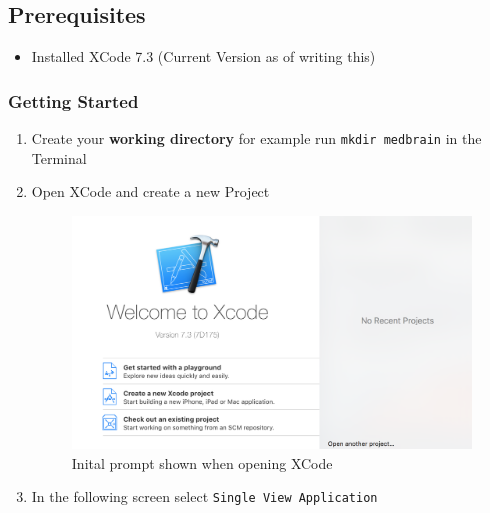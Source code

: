 \documentclass{article}
\begin{document}
\subsection{Prerequisites}\label{step1:prerequisites}

\begin{itemize}

\item
  Installed XCode 7.3 (Current Version as of writing this)
\end{itemize}

\subsubsection{Getting Started}\label{step1:getting-started}

\begin{enumerate}
\def\labelenumi{\arabic{enumi}.}
\item
  Create your \textbf{working directory} for example run
  \texttt{mkdir\ medbrain} in the Terminal
\item
  Open XCode and create a new Project

\begin{figure}[H]
\centering
\includegraphics[width=\linewidth]{resources/step1/step_1_1.png}
\caption{Inital prompt shown when opening XCode}
\label{fig:create_project_screen}
\end{figure}

\item
  In the following screen select \texttt{Single\ View\ Application}


\end{enumerate}
\end{document}
